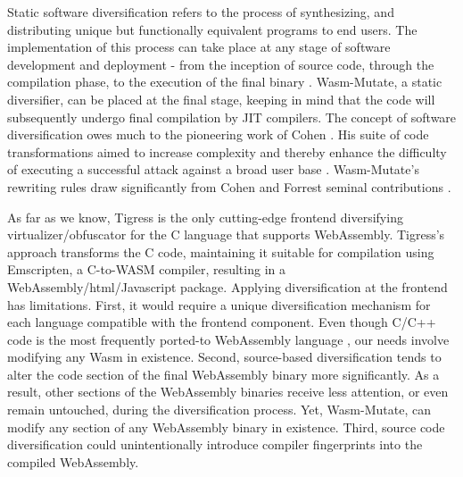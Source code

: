 \documentclass[a4paper,fleqn]{cas-dc}
\newcommand*\badge[1]{ \colorbox{red}{\color{white}#1}}
\newcommand{\tool}{{\sc Wasm-Mutate}\xspace}
\newcommand{\Wasm}{WebAssembly\xspace}
\newenvironment{revision1}{\color{blue}}{}
\newcommand{\todo}[1]{%
\refstepcounter{todo}
\noindent\textbf{\badge{TODO}} {\color{red}#1}
\addcontentsline{td}{todo}
{\color{red}\thesection.\thetodo\xspace #1}}
\begin{document}

Static software diversification refers to the process of  synthesizing, and distributing unique but functionally equivalent programs to end users. 
The implementation of this process can take place at any stage of software development and deployment - from the inception of source code, through the compilation phase, to the execution of the final binary \cite{jackson2011compiler, lundquist2016searching}.
\tool, a static diversifier, can be placed at the final stage, keeping in mind that the code will subsequently undergo final compilation by JIT compilers.
The concept of software diversification owes much to the pioneering work of Cohen \cite{cohen1993operating}. 
His suite of code transformations aimed to increase complexity and thereby enhance the difficulty of executing a successful attack against a broad user base \cite{cohen1993operating}. 
\tool's rewriting rules draw significantly from Cohen and Forrest seminal contributions \cite{cohen1993operating, 595185}.

\begin{revision1}
As far as we know, Tigress is the only cutting-edge frontend diversifying virtualizer/obfuscator for the C language that supports \Wasm \cite{10.1145/3176258, 203634}.
Tigress's approach transforms the C code, maintaining it suitable for compilation using Emscripten, a C-to-WASM compiler, resulting in a WebAssembly/html/Javascript package.
Applying diversification at the frontend has limitations. First, it would require a unique diversification mechanism for each language compatible with the frontend component.
Even though C/C++ code is the most frequently ported-to \Wasm language \cite{hilbig2021empirical}, our needs involve modifying any Wasm in existence.
Second, source-based diversification tends to alter the code section of the final \Wasm binary more significantly.
As a result, other sections of the \Wasm binaries receive less attention, or even remain untouched, during the diversification process.
Yet, \tool, can modify any section of any \Wasm binary in existence.
Third, source code diversification could unintentionally introduce compiler fingerprints into the compiled \Wasm \cite{CABRERAARTEAGA2023103296}.

\end{revision1}
\end{document}

